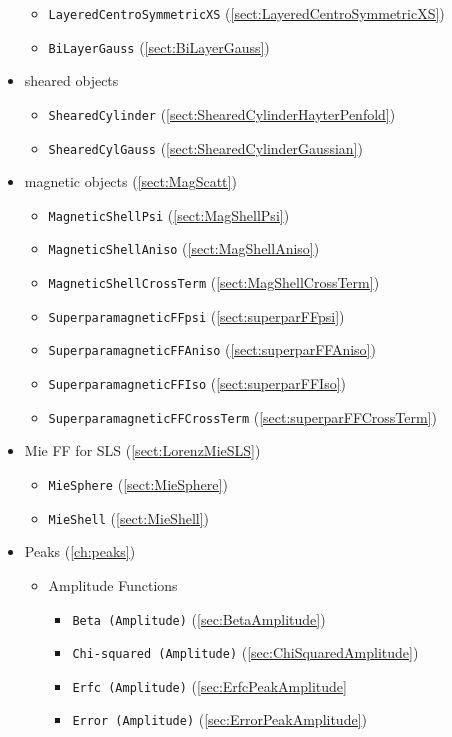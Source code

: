 \begin{itemize}
\begin{itemize}
  \item \texttt{LayeredCentroSymmetricXS} (\ref{sect:LayeredCentroSymmetricXS})
  \item \texttt{BiLayerGauss} (\ref{sect:BiLayerGauss})
\end{itemize}
\item sheared objects
\begin{itemize}
  \item \texttt{ShearedCylinder} (\ref{sect:ShearedCylinderHayterPenfold})
  \item \texttt{ShearedCylGauss} (\ref{sect:ShearedCylinderGaussian})
\end{itemize}
\item magnetic objects (\ref{sect:MagScatt})
\begin{itemize}
  \item \texttt{MagneticShellPsi} (\ref{sect:MagShellPsi})
  \item \texttt{MagneticShellAniso} (\ref{sect:MagShellAniso})
  \item \texttt{MagneticShellCrossTerm} (\ref{sect:MagShellCrossTerm})
  \item \texttt{SuperparamagneticFFpsi} (\ref{sect:superparFFpsi})
  \item \texttt{SuperparamagneticFFAniso} (\ref{sect:superparFFAniso})
  \item \texttt{SuperparamagneticFFIso} (\ref{sect:superparFFIso})
  \item \texttt{SuperparamagneticFFCrossTerm} (\ref{sect:superparFFCrossTerm})
\end{itemize}
\item Mie FF for SLS (\ref{sect:LorenzMieSLS})
\begin{itemize}
  \item \texttt{MieSphere} (\ref{sect:MieSphere})
  \item \texttt{MieShell} (\ref{sect:MieShell})
\end{itemize}
\item Peaks (\ref{ch:peaks})
\begin{itemize}
  \item Amplitude Functions
  \begin{itemize}
    \item \texttt{Beta (Amplitude)} (\ref{sec:BetaAmplitude})
    \item \texttt{Chi-squared (Amplitude)} (\ref{sec:ChiSquaredAmplitude})
    \item \texttt{Erfc (Amplitude)} (\ref{sec:ErfcPeakAmplitude}
    \item \texttt{Error (Amplitude)} (\ref{sec:ErrorPeakAmplitude})

\end{itemize}
\end{itemize}
\end{itemize}
